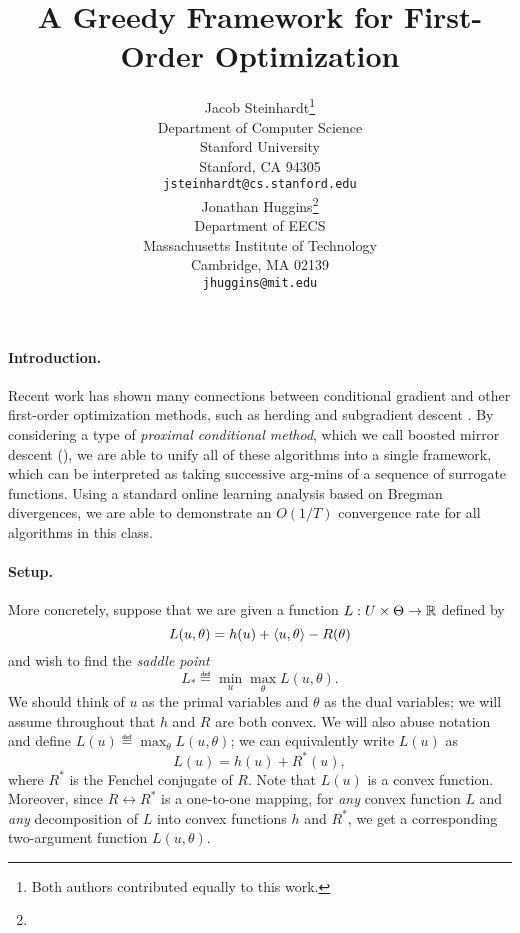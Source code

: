 \documentclass{article} %
\title{A Greedy Framework for First-Order Optimization}
\author{
Jacob Steinhardt\thanks{Both authors contributed equally to this work.} \\
Department of Computer Science\\
Stanford University\\
Stanford, CA 94305 \\
\texttt{jsteinhardt@cs.stanford.edu} \\
\And
Jonathan Huggins\footnote[1]{}\\
Department of EECS \\
Massachusetts Institute of Technology \\
Cambridge, MA 02139 \\
\texttt{jhuggins@mit.edu}
}
\begin{document}
\maketitle

\paragraph{Introduction.} 
Recent work has shown many connections between conditional gradient 
and other first-order optimization methods, such as herding \cite{Bach:2012a} 
and subgradient descent \cite{Bach:2012b}. By considering a type of 
\emph{proximal conditional method}, which we call boosted mirror 
descent (\bmd), we are able to unify all of these algorithms into 
a single framework, which can be interpreted as taking successive 
arg-mins of a sequence of surrogate functions. Using a standard 
online learning analysis based on Bregman divergences, we are 
able to demonstrate an $O(1/T)$ convergence rate for all algorithms 
in this class. 

\paragraph{Setup.} 
More concretely, suppose that we are given a function 
$L : U \times \Theta \to \mathbb{R}$ defined by
\[ L(u, \theta) = h(u) + \left\langle u, \theta \right\rangle - R(\theta) \]
and wish to find the \emph{saddle point} 
\[ L_* \eqdef \min_{u} \max_{\theta} L(u, \theta). \]
We should think of $u$ as the primal variables and $\theta$ 
as the dual variables; we will assume throughout that 
$h$ and $R$ are both convex. We will also abuse notation 
and define $L(u) \eqdef \max_{\theta} L(u, \theta)$; we 
can equivalently write $L(u)$ as 
\[ L(u) = h(u) + R^*(u), \]
where $R^*$ is the Fenchel conjugate of $R$. Note that 
$L(u)$ is a convex function. Moreover, since 
$R \leftrightarrow R^*$ is a one-to-one mapping, for 
\emph{any} convex function $L$ and \emph{any} decomposition 
of $L$ into convex functions $h$ and $R^*$, we get a 
corresponding two-argument function $L(u, \theta)$. 
\end{document}
